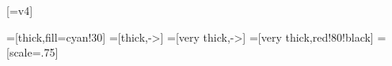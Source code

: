 \usepackage[lf]{carlito}
\usepackage{siunitx}
\usepackage[siunitx]{circuitikz}
\usepackage{tikz}
\usepackage{mathpazo}
\usepackage{bm}
\usepackage{mathtools}
\usepackage[ISO]{diffcoeff}[=v4]
\usepackage{xcolor,colortbl}

\setlength{\parskip}{0pt}
\renewcommand{\baselinestretch}{1}


\tikzset{
  >=latex,
  voltage dir=RP,
}
=[thick,fill=cyan!30]
=[thick,->]
=[very thick,->]
=[very thick,red!80!black]
=[scale=.75]
